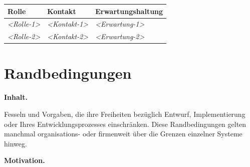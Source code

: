 \documentclass[]{article}
\begin{document}
\begin{longtable}[]{@{}lll@{}}
\toprule
\begin{minipage}[b]{0.23\columnwidth}\raggedright\strut
Rolle\strut
\end{minipage} & \begin{minipage}[b]{0.23\columnwidth}\raggedright\strut
Kontakt\strut
\end{minipage} & \begin{minipage}[b]{0.46\columnwidth}\raggedright\strut
Erwartungshaltung\strut
\end{minipage}\tabularnewline
\midrule
\endhead
\begin{minipage}[t]{0.23\columnwidth}\raggedright\strut
\emph{\textless{}Rolle-1\textgreater{}}\strut
\end{minipage} & \begin{minipage}[t]{0.23\columnwidth}\raggedright\strut
\emph{\textless{}Kontakt-1\textgreater{}}\strut
\end{minipage} & \begin{minipage}[t]{0.46\columnwidth}\raggedright\strut
\emph{\textless{}Erwartung-1\textgreater{}}\strut
\end{minipage}\tabularnewline
\begin{minipage}[t]{0.23\columnwidth}\raggedright\strut
\emph{\textless{}Rolle-2\textgreater{}}\strut
\end{minipage} & \begin{minipage}[t]{0.23\columnwidth}\raggedright\strut
\emph{\textless{}Kontakt-2\textgreater{}}\strut
\end{minipage} & \begin{minipage}[t]{0.46\columnwidth}\raggedright\strut
\emph{\textless{}Erwartung-2\textgreater{}}\strut
\end{minipage}\tabularnewline
\bottomrule
\end{longtable}

\section{Randbedingungen}\label{section-architecture-constraints}

\textbf{Inhalt.}

Fesseln und Vorgaben, die ihre Freiheiten bezüglich Entwurf,
Implementierung oder Ihres Entwicklungsprozesses einschränken. Diese
Randbedingungen gelten manchmal organisations- oder firmenweit über die
Grenzen einzelner Systeme hinweg.

\textbf{Motivation.}
\end{document}
